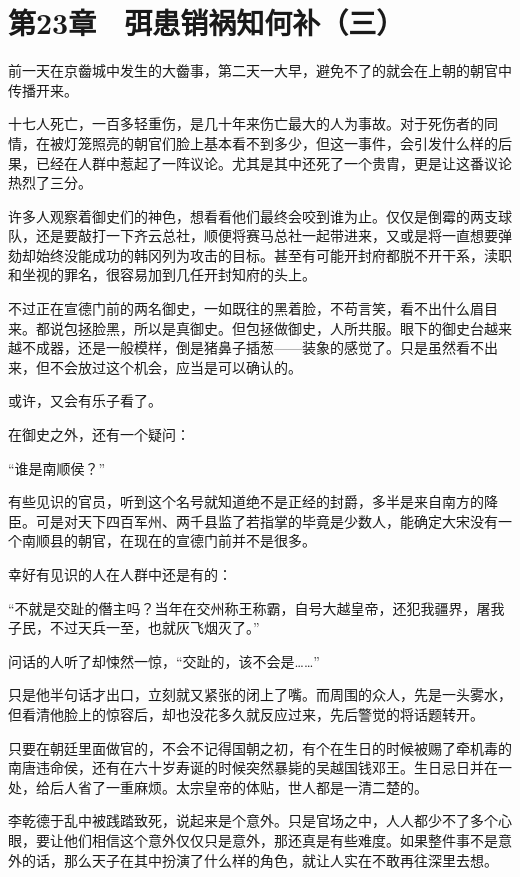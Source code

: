 \section{第23章　弭患销祸知何补（三）}

前一天在京齤城中发生的大齤事，第二天一大早，避免不了的就会在上朝的朝官中传播开来。

十七人死亡，一百多轻重伤，是几十年来伤亡最大的人为事故。对于死伤者的同情，在被灯笼照亮的朝官们脸上基本看不到多少，但这一事件，会引发什么样的后果，已经在人群中惹起了一阵议论。尤其是其中还死了一个贵胄，更是让这番议论热烈了三分。

许多人观察着御史们的神色，想看看他们最终会咬到谁为止。仅仅是倒霉的两支球队，还是要敲打一下齐云总社，顺便将赛马总社一起带进来，又或是将一直想要弹劾却始终没能成功的韩冈列为攻击的目标。甚至有可能开封府都脱不开干系，渎职和坐视的罪名，很容易加到几任开封知府的头上。

不过正在宣德门前的两名御史，一如既往的黑着脸，不苟言笑，看不出什么眉目来。都说包拯脸黑，所以是真御史。但包拯做御史，人所共服。眼下的御史台越来越不成器，还是一般模样，倒是猪鼻子插葱——装象的感觉了。只是虽然看不出来，但不会放过这个机会，应当是可以确认的。

或许，又会有乐子看了。

在御史之外，还有一个疑问：

“谁是南顺侯？”

有些见识的官员，听到这个名号就知道绝不是正经的封爵，多半是来自南方的降臣。可是对天下四百军州、两千县监了若指掌的毕竟是少数人，能确定大宋没有一个南顺县的朝官，在现在的宣德门前并不是很多。

幸好有见识的人在人群中还是有的：

“不就是交趾的僭主吗？当年在交州称王称霸，自号大越皇帝，还犯我疆界，屠我子民，不过天兵一至，也就灰飞烟灭了。”

问话的人听了却悚然一惊，“交趾的，该不会是……”

只是他半句话才出口，立刻就又紧张的闭上了嘴。而周围的众人，先是一头雾水，但看清他脸上的惊容后，却也没花多久就反应过来，先后警觉的将话题转开。

只要在朝廷里面做官的，不会不记得国朝之初，有个在生日的时候被赐了牵机毒的南唐违命侯，还有在六十岁寿诞的时候突然暴毙的吴越国钱邓王。生日忌日并在一处，给后人省了一重麻烦。太宗皇帝的体贴，世人都是一清二楚的。

李乾德于乱中被践踏致死，说起来是个意外。只是官场之中，人人都少不了多个心眼，要让他们相信这个意外仅仅只是意外，那还真是有些难度。如果整件事不是意外的话，那么天子在其中扮演了什么样的角色，就让人实在不敢再往深里去想。

